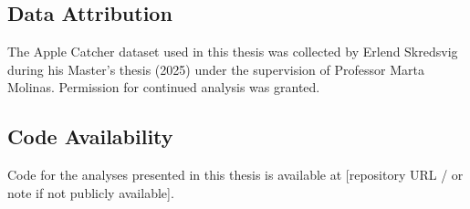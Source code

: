\subsection*{Data Attribution}
The Apple Catcher dataset used in this thesis was collected by 
Erlend Skredsvig during his Master's thesis (2025) under the 
supervision of Professor Marta Molinas. Permission for continued 
analysis was granted.

\subsection*{Code Availability}
Code for the analyses presented in this thesis is available at 
[repository URL / or note if not publicly available].
